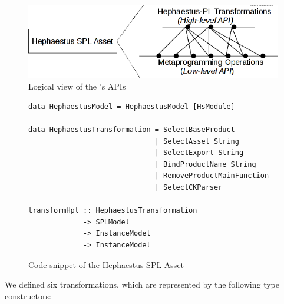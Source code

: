 \begin{center}
\begin{figure}[htb]
\includegraphics[scale=0.7]{imagens/apis-hpl-asset.png}
\caption{Logical view of the \hpl's APIs}
\label{fig:apis-hpl-asset}
\end{figure}
\end{center}



\begin{figure}
\begin{lstlisting}
data HephaestusModel = HephaestusModel [HsModule]

data HephaestusTransformation = SelectBaseProduct
                              | SelectAsset String
                              | SelectExport String
                              | BindProductName String
                              | RemoveProductMainFunction
                              | SelectCKParser

transformHpl :: HephaestusTransformation
             -> SPLModel
             -> InstanceModel
             -> InstanceModel
\end{lstlisting}
\caption{Code snippet of the Hephaestus SPL Asset}
\label{fig:code-hp-spl-asset}
\end{figure}

We defined six \hpl{} transformations, which are represented by the following type constructors:

